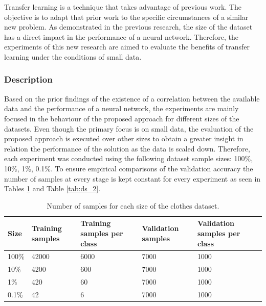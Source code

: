 \documentclass{article}
\begin{document}
Transfer learning is a technique that takes advantage of previous work. The objective is to adapt that prior work to the specific circumstances of a similar new problem. As demonstrated in the previous research, the size of the dataset has a direct impact in the performance of a neural network. Therefore, the experiments of this new research are aimed to evaluate the benefits of transfer learning under the conditions of small data.

\subsubsection{\textbf{Description}}

Based on the prior findings of the existence of a correlation between the available data and the performance of a neural network, the experiments are mainly focused in the behaviour of the proposed approach for different sizes of the datasets. Even though the primary focus is on small data, the evaluation of the proposed approach is executed over other sizes to obtain a greater insight in relation the performance of the solution as the data is scaled down. Therefore, each experiment was conducted using the following dataset sample sizes: 100\%, 10\%, 1\%, 0.1\%. To ensure empirical comparisons of the validation accuracy the number of samples at every stage is kept constant for every experiment as seen in Tables \ref{tab:ds_1} and Table \ref{tab:ds_2}.

\begin{table}[!htb]
  \centering
  \begin{tabular}{| l | l | l | l | l |}
    \hline
    \textbf{Size} & \textbf{Training samples} & \textbf{Training samples per class} & \textbf{Validation samples} & \textbf{Validation samples per class} \\ \hline
    100\% & 42000 & 6000 & 7000 & 1000 \\ \hline
    10\% & 4200 & 600 & 7000 & 1000 \\ \hline
    1\% & 420  & 60 & 7000 & 1000 \\ \hline
    0.1\% & 42 & 6 & 7000 & 1000 \\ \hline
  \end{tabular}
  \caption{Number of samples for each size of the clothes dataset.}
  \label{tab:ds_1}
\end{table}  
  
\end{document}
